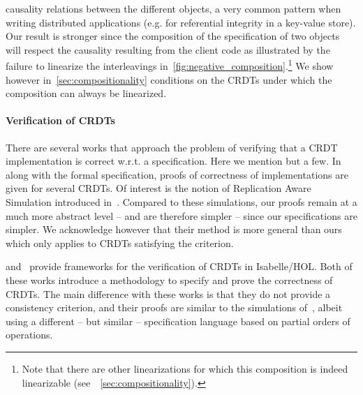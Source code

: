 \begin{inparaenum}
  causality relations between the different objects, a very common
  pattern when writing distributed applications (e.g. for referential
  integrity in a key-value store).
  Our result is stronger since the composition of the specification of
  two objects will respect the causality resulting from the client code as
  illustrated by the failure to linearize the interleavings
  in~\autoref{fig:negative_composition}.\footnote{Note that there
    are other linearizations for which this composition is indeed
    linearizable (see~\sectionautorefname~\ref{sec:compositionality}).}
  We show however in~\autoref{sec:compositionality} conditions on the
  CRDTs under which the composition can always be linearized.
\end{inparaenum}

\paragraph{Verification of CRDTs}
There are several works that approach the problem of verifying that a
CRDT implementation is correct w.r.t. a specification.
%
Here we mention but a few.
%
In~\cite{BurckhardtGYZ14, AttiyaBGMYZ16, Burckhardt14} along with the
formal specification, proofs of correctness of implementations are
given for several CRDTs.
%
Of interest is the notion of Replication Aware Simulation introduced
in~\cite{BurckhardtGYZ14}.
%
Compared to these simulations, our proofs remain at a much more
abstract level -- and are therefore simpler -- since our
specifications are simpler.
%
We acknowledge however that their method is more general than ours
which only applies to CRDTs satisfying the \CRDTLinshort{} criterion.

\citet{ZellerBP14} and~\citet{GomesKMB17} provide frameworks for the
verification of CRDTs in Isabelle/HOL\@.
%
Both of these works introduce a methodology to specify and prove the
correctness of CRDTs.
%
The main difference with these works is that they do not provide a
consistency criterion, and their proofs are similar to the simulations
of~\cite{BurckhardtGYZ14}, albeit using a different -- but similar
-- specification language based on partial orders of operations.

